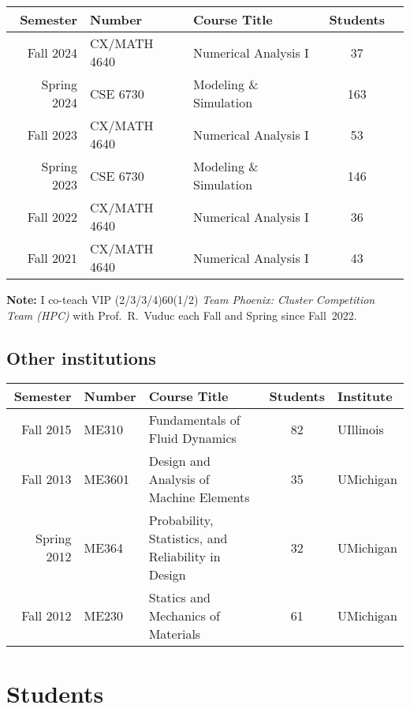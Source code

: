 \begin{center}
    \begin{longtable}{ r l l c c }
        \bf Semester&\bf Number     & \bf Course Title                  & \bf Students  \\ \midrule
        Fall 2024   & CX/MATH 4640   & Numerical Analysis I              & \phantom{1}37 \\
        Spring 2024 & CSE 6730       & Modeling \& Simulation            & 163 \\
        Fall 2023   & CX/MATH 4640   & Numerical Analysis I              & \phantom{1}53 \\
        Spring 2023 & CSE 6730       & Modeling \& Simulation            & 146           \\
        Fall 2022   & CX/MATH 4640   & Numerical Analysis I              & \phantom{1}36 \\
        Fall 2021   & CX/MATH 4640   & Numerical Analysis I              & \phantom{1}43 
    \end{longtable}
\end{center}
\vspace{-0.8cm}
\textbf{Note:} I co-teach VIP (2/3/3/4)60(1/2) \textit{Team Phoenix: Cluster Competition Team (HPC)} with Prof.~R.~Vuduc each Fall and Spring since Fall~2022.

\subsection{Other institutions}

\begin{center}
    \begin{tabular}{ r l l c l }
        \bf Semester  &\bf Number & \bf Course Title & \bf Students & \bf Institute \\
        \midrule
        Fall   2015 & ME310  & Fundamentals of Fluid Dynamics & 82 & UIllinois \\
        Fall   2013 & ME3601 & Design and Analysis of Machine Elements & 35 & UMichigan\\
        Spring 2012 & ME364  & Probability, Statistics, and Reliability in Design & 32 & UMichigan \\
        Fall   2012 & ME230  & Statics and Mechanics of Materials & 61 & UMichigan \\
    \end{tabular}
\end{center}

\section{Students}

